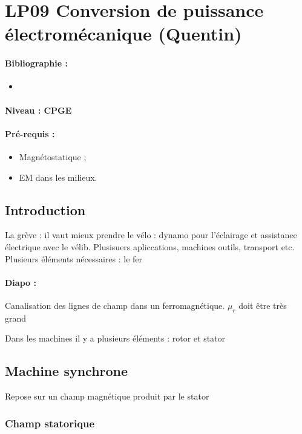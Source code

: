 \section{LP09 Conversion de puissance électromécanique (Quentin)}

\paragraph{Bibliographie :}
\begin{itemize}
\item 
\end{itemize}

\paragraph{Niveau : CPGE} 

\paragraph{Pré-requis :}
\begin{itemize}
\item Magnétostatique ;
\item EM dans les milieux.
\end{itemize}

\subsection{Introduction}

La grève : il vaut mieux prendre le vélo : dynamo pour l'éclairage et assistance électrique avec le vélib.
Plusisuers apliccations, machines outils, transport etc.
Plusieurs éléments nécessaires : le fer

\paragraph{Diapo : } Canalisation des lignes de champ dans un ferromagnétique.
$\mu_r$ doit être très grand

Dans les machines il y a plusieurs éléments : rotor et stator

\subsection{Machine synchrone}

Repose sur un champ magnétique produit par le stator

\subsubsection{Champ statorique}


